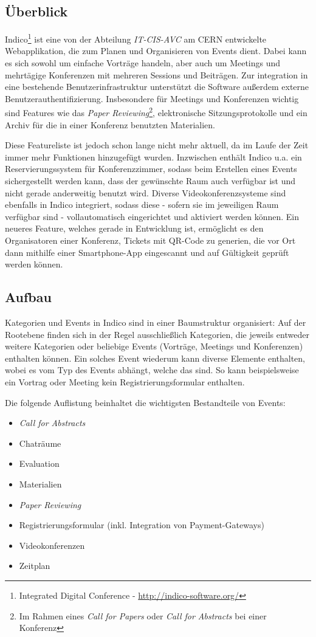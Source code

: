 \subsection{Überblick}
Indico\footnote{Integrated Digital Conference - \href{http://indico-software.org/}{http://indico-software.org/}}
ist eine von der Abteilung \emph{IT-CIS-AVC} am CERN entwickelte Webapplikation, die zum Planen und
Organisieren von Events dient. Dabei kann es sich sowohl um einfache Vorträge handeln, aber auch um
Meetings und mehrtägige Konferenzen mit mehreren Sessions und Beiträgen. Zur integration in eine
bestehende Benutzerinfrastruktur unterstützt die Software außerdem externe
Benutzerauthentifizierung. Insbesondere für Meetings und Konferenzen wichtig sind Features wie das
\emph{Paper Reviewing}\footnote{Im Rahmen eines \emph{Call for Papers} oder \emph{Call for
Abstracts} bei einer Konferenz}, elektronische Sitzungsprotokolle und ein Archiv für die in einer
Konferenz benutzten Materialien. \citep{indico}

Diese Featureliste ist jedoch schon lange nicht mehr aktuell, da im Laufe der Zeit immer mehr
Funktionen hinzugefügt wurden. Inzwischen enthält Indico u.a. ein Reservierungssystem für
Konferenzzimmer, sodass beim Erstellen eines Events sichergestellt werden kann, dass der gewünschte
Raum auch verfügbar ist und nicht gerade anderweitig benutzt wird. Diverse Videokonferenzsysteme
sind ebenfalls in Indico integriert, sodass diese - sofern sie im jeweiligen Raum verfügbar sind -
vollautomatisch eingerichtet und aktiviert werden können. Ein neueres Feature, welches gerade in
Entwicklung ist, ermöglicht es den Organisatoren einer Konferenz, Tickets mit QR-Code zu generien,
die vor Ort dann mithilfe einer Smartphone-App eingescannt und auf Gültigkeit geprüft werden können.

\subsection{Aufbau}
Kategorien und Events in Indico sind in einer Baumstruktur organisiert: Auf der Rootebene finden
sich in der Regel ausschließlich Kategorien, die jeweils entweder weitere Kategorien oder beliebige
Events (Vorträge, Meetings und Konferenzen) enthalten können. Ein solches Event wiederum kann
diverse Elemente enthalten, wobei es vom Typ des Events abhängt, welche das sind. So kann
beispielsweise ein Vortrag oder Meeting kein Registrierungsformular enthalten.

Die folgende Auflistung beinhaltet die wichtigsten Bestandteile von Events:
\begin{itemize}
\item \emph{Call for Abstracts}
\item Chaträume
\item Evaluation
\item Materialien
\item \emph{Paper Reviewing}
\item Registrierungsformular (inkl. Integration von Payment-Gateways)
\item Videokonferenzen
\item Zeitplan
\end{itemize}

